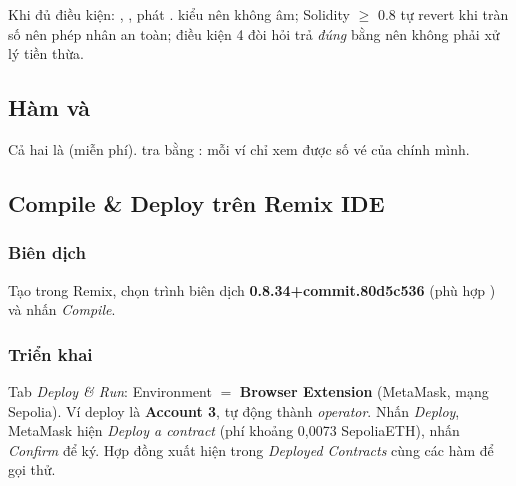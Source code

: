 Khi đủ điều kiện: , , phát .
 kiểu  nên không âm; Solidity $\ge$ 0.8 tự revert khi tràn số nên phép nhân an toàn;
điều kiện 4 đòi hỏi trả \emph{đúng} bằng nên không phải xử lý tiền thừa.

\subsection{Hàm  và }



Cả hai là  (miễn phí).  tra  bằng : mỗi ví chỉ xem được số vé của chính mình.

\subsection{Compile \& Deploy trên Remix IDE}

\subsubsection{Biên dịch}

Tạo  trong Remix, chọn trình biên dịch \textbf{0.8.34+commit.80d5c536} (phù hợp ) và nhấn \emph{Compile}.


\subsubsection{Triển khai}

Tab \emph{Deploy \& Run}: Environment $=$ \textbf{Browser Extension} (MetaMask, mạng Sepolia). Ví deploy là \textbf{Account 3}, tự động thành \emph{operator}.
Nhấn \emph{Deploy}, MetaMask hiện \emph{Deploy a contract} (phí khoảng 0,0073 SepoliaETH), nhấn \emph{Confirm} để ký.
Hợp đồng xuất hiện trong \emph{Deployed Contracts} cùng các hàm để gọi thử.


